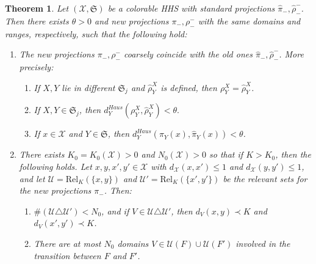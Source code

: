 \documentclass{amsart}
\newtheorem{theorem}{Theorem}[section]
\theoremstyle{definition}
\theoremstyle{remark}
\theoremstyle{definition}
\newcommand{\calU}{\mathcal{U}}
\newcommand{\calX}{\mathcal{X}}
\newcommand{\Rel}{\mathrm{Rel}}
\begin{document}
\begin{theorem}\label{thm:controlling domains}
Let $(\calX, \mathfrak S)$ be a colorable HHS with standard projections $\hat{\pi}_{-}, \hat{\rho}^{-}_{-}$.  Then there exists $\theta>0$ and new projections $\pi_{-}, \rho^{-}_{-}$ with the same domains and ranges, respectively, such that the following hold:

\begin{enumerate}
\item The new projections $\pi_{-}, \rho^{-}_{-}$ coarsely coincide with the old ones $\hat{\pi}_{-}, \hat{\rho}^{-}_{-}$.  More precisely:
\begin{enumerate}
\item If $X,Y$ lie in different $\mathfrak S_j$ and $\hat{\rho}^X_Y$ is defined, then $\rho^X_Y = \hat{\rho}^X_Y$.
\item If $X,Y \in \mathfrak S_j$, then $d^{Haus}_{Y}(\rho^X_Y, \hat{\rho}^X_Y)<\theta.$
\item If $x \in \calX$ and $Y \in \mathfrak S$, then $d^{Haus}_Y(\pi_Y(x),\hat{\pi}_Y(x))<\theta$.
\end{enumerate}
\item There exists $K_0 = K_0(\calX)>0$ and $N_0(\calX)>0$ so that if $K>K_0$, then the following holds.  Let $x,y,x',y' \in \calX$ with $d_{\calX}(x,x') \leq 1 $ and $d_{\calX}(y,y') \leq 1$, and let $\calU = \Rel_K(\{x,y\})$ and $\calU' = \Rel_K(\{x',y'\})$ be the relevant sets for the new projections $\pi_-$.  Then:
\begin{enumerate}
\item $\#(\calU \triangle \calU') < N_0$, and if $V \in \calU \triangle \calU'$, then $d_V(x,y) \prec K$ and $d_V(x',y') \prec K$. \label{item:bounded symdiff}
\item  There are at most $N_0$ domains $V \in \calU(F) \cup \calU(F')$ involved in the transition between $F$ and $F'$. \label{item:bounded involved}
\end{enumerate}
\end{enumerate}
\end{theorem}
\end{document}
